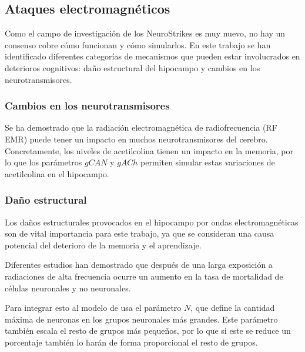 \documentclass[12pt, letterpaper]{article}
\begin{document}
\subsection{Ataques electromagnéticos}
Como el campo de investigación de los NeuroStrikes es muy nuevo, no hay un consenso cobre cómo funcionan y cómo simularlos. En este trabajo se han identificado diferentes categorías de mecanismos que pueden estar involucrados en deterioros cognitivos: daño estructural del hipocampo y cambios en los neurotransmisores.

\subsubsection{Cambios en los neurotransmisores}
Se ha demostrado que la radiación electromagnética de radiofrecuencia (RF EMR) puede tener un impacto en muchos neurotransmisores del cerebro. Concretamente, los niveles de acetilcolina tienen un impacto en la memoria, por lo que los parámetros $gCAN$ y $gACh$ permiten simular estas variaciones de acetilcolina en el hipocampo.

\subsubsection{Daño estructural}
Los daños estructurales provocados en el hipocampo por ondas electromagnéticas son de vital importancia para este trabajo, ya que se consideran una causa potencial del deterioro de la memoria y el aprendizaje.

Diferentes estudios han demostrado que después de una larga exposición a radiaciones de alta frecuencia ocurre un aumento en la tasa de mortalidad de células neuronales y no neuronales.

Para integrar esto al modelo de usa el parámetro $N$, que define la cantidad máxima de neuronas en los grupos neuronales más grandes. Este parámetro también escala el resto de grupos más pequeños, por lo que si este se reduce un porcentaje también lo harán de forma proporcional el resto de grupos.
\end{document}
